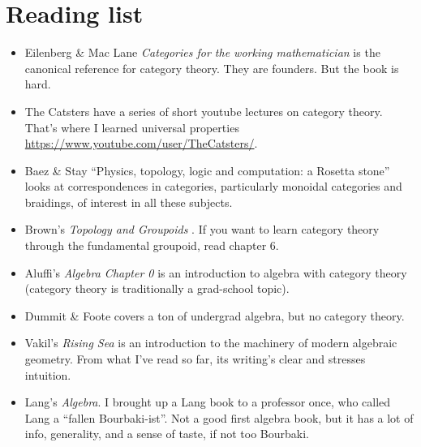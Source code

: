 \documentclass[a5paper]{scrartcl}
\def\book#1{\textit{#1}}
\begin{document}
\section{Reading list}
\begin{itemize}
  \item Eilenberg \& Mac Lane \book{Categories for the working mathematician} \cite{working} is the canonical reference for category theory. They are founders. But the book is hard.
  \item The Catsters have a series of short youtube lectures on category theory. That's where I learned universal properties \url{https://www.youtube.com/user/TheCatsters/}.
  \item Baez \& Stay ``Physics, topology, logic and computation: a Rosetta stone'' \cite{rosetta} looks at correspondences in categories, particularly monoidal categories and braidings, of interest in all these subjects.

  \item Brown's \book{Topology and Groupoids} \cite{groupoid}. If you want to learn category theory through the fundamental groupoid, read chapter 6.

  \item Aluffi's \book{Algebra Chapter 0} is an introduction to algebra with category theory (category theory is traditionally a grad-school topic).

  \item Dummit \& Foote \cite{dummit+foote} covers a ton of undergrad algebra, but no category theory.

  \item Vakil's \book{Rising Sea} is an introduction to the machinery of modern algebraic geometry. From what I've read so far, its  writing's clear and stresses intuition.

  \item Lang's \book{Algebra}. I brought up a Lang book to a professor once, who called Lang a ``fallen Bourbaki-ist''. Not a good first algebra book, but it has a lot of info, generality, and a sense of taste, if not too Bourbaki.

\end{itemize}
\printbibliography
\end{document}
